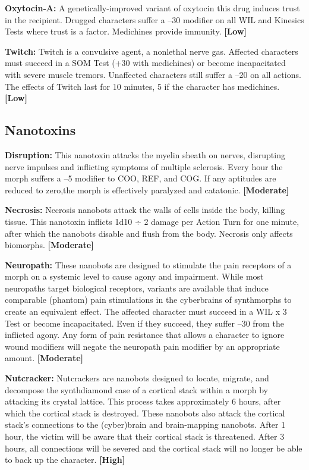\textbf{Oxytocin-A:} A genetically-improved variant of oxytocin
this drug induces trust in the recipient. Drugged
characters suffer a –30 modifier on all WIL and Kinesics
Tests where trust is a factor. Medichines provide
immunity. \textbf{[Low]}

\textbf{Twitch:} Twitch is a convulsive agent, a nonlethal 
nerve gas. Affected characters must succeed in a SOM 
Test (+30 with medichines) or become incapacitated 
with severe muscle tremors. Unaffected characters still 
suffer a –20 on all actions. The effects of Twitch last for 
10 minutes, 5 if the character has medichines. \textbf{[Low]}

\subsection{Nanotoxins}

\textbf{Disruption:} This nanotoxin attacks the myelin sheath 
on nerves, disrupting nerve impulses and inflicting 
symptoms of multiple sclerosis. Every hour the morph 
suffers a –5 modifier to COO, REF, and COG. If any 
aptitudes are reduced to zero,the morph is effectively 
paralyzed and catatonic. \textbf{[Moderate]}

\textbf{Necrosis:} Necrosis nanobots attack the walls of cells 
inside the body, killing tissue. This nanotoxin inflicts 
1d10 ÷ 2 damage per Action Turn for one minute, after 
which the nanobots disable and flush from the body. 
Necrosis only affects biomorphs. \textbf{[Moderate]}

\textbf{Neuropath:} These nanobots are designed to stimulate
the pain receptors of a morph on a systemic level
to cause agony and impairment. While most neuropaths
target biological receptors, variants are available
that induce comparable (phantom) pain stimulations
in the cyberbrains of synthmorphs to create an
equivalent effect. The affected character must succeed 
in a WIL x 3 Test or become incapacitated. Even if 
they succeed, they suffer –30 from the inflicted agony. 
Any form of pain resistance that allows a character 
to ignore wound modifiers will negate the neuropath 
pain modifier by an appropriate amount. \textbf{[Moderate]}

\textbf{Nutcracker:} Nutcrackers are nanobots designed to 
locate, migrate, and decompose the synthdiamond 
case of a cortical stack within a morph by attacking 
its crystal lattice. This process takes approximately 
6 hours, after which the cortical stack is destroyed. 
These nanobots also attack the cortical stack's connections
to the (cyber)brain and brain-mapping nanobots.
After 1 hour, the victim will be aware that their cortical
stack is threatened. After 3 hours, all connections
will be severed and the cortical stack will no longer be 
able to back up the character. \textbf{[High]}

